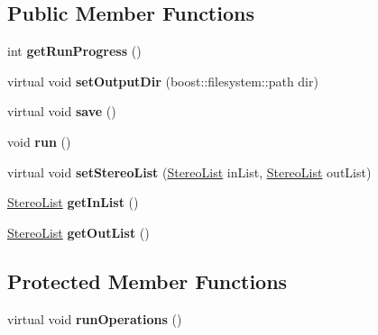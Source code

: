 \subsection*{Public Member Functions}
\begin{DoxyCompactItemize}
\item 
int {\bfseries get\+Run\+Progress} ()\hypertarget{classStereoProcessor_ac021dd7917bc9739fba1e51394b002be}{}\label{classStereoProcessor_ac021dd7917bc9739fba1e51394b002be}

\item 
virtual void {\bfseries set\+Output\+Dir} (boost\+::filesystem\+::path dir)\hypertarget{classStereoProcessor_a42c26120d6a789464c40817ebb7d438d}{}\label{classStereoProcessor_a42c26120d6a789464c40817ebb7d438d}

\item 
virtual void {\bfseries save} ()\hypertarget{classStereoProcessor_ad87e9bffe4e8823c151ec5dcfd4b181d}{}\label{classStereoProcessor_ad87e9bffe4e8823c151ec5dcfd4b181d}

\item 
void {\bfseries run} ()\hypertarget{classStereoProcessor_a87e657d3cca54712c14f0ae80985d38d}{}\label{classStereoProcessor_a87e657d3cca54712c14f0ae80985d38d}

\item 
virtual void {\bfseries set\+Stereo\+List} (\hyperlink{classStereoList}{Stereo\+List} in\+List, \hyperlink{classStereoList}{Stereo\+List} out\+List)\hypertarget{classStereoProcessor_a8d9689c04817ca231bbf5c3d219d2f4d}{}\label{classStereoProcessor_a8d9689c04817ca231bbf5c3d219d2f4d}

\item 
\hyperlink{classStereoList}{Stereo\+List} {\bfseries get\+In\+List} ()\hypertarget{classStereoProcessor_a170d67147f395304c73c3066d1dd2300}{}\label{classStereoProcessor_a170d67147f395304c73c3066d1dd2300}

\item 
\hyperlink{classStereoList}{Stereo\+List} {\bfseries get\+Out\+List} ()\hypertarget{classStereoProcessor_a7f548c7e7a51e9c9a6db8cfd29a99660}{}\label{classStereoProcessor_a7f548c7e7a51e9c9a6db8cfd29a99660}

\end{DoxyCompactItemize}
\subsection*{Protected Member Functions}
\begin{DoxyCompactItemize}
\item 
virtual void {\bfseries run\+Operations} ()\hypertarget{classStereoProcessor_acee8d2d5310c5b6a20f6cc8037d2fd6d}{}\label{classStereoProcessor_acee8d2d5310c5b6a20f6cc8037d2fd6d}

\end{DoxyCompactItemize}

